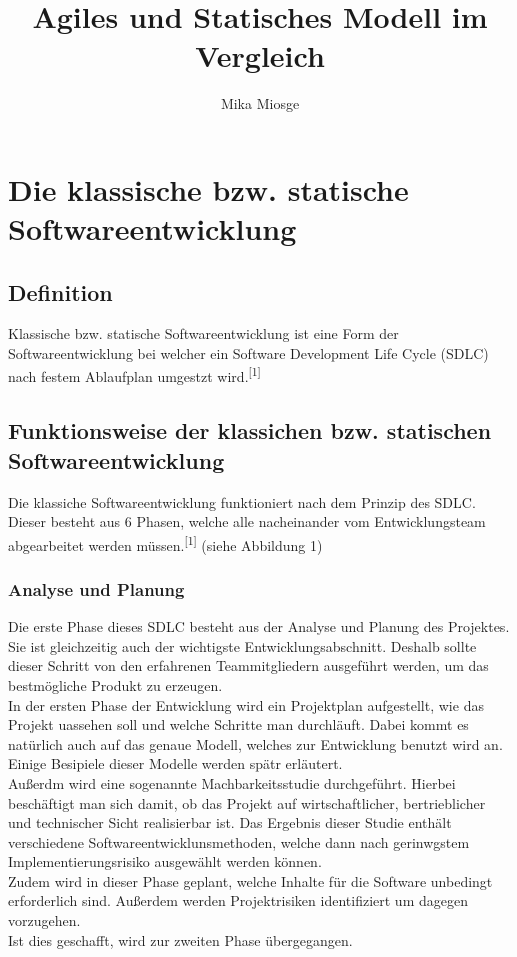 \documentclass[a4paper, 10pt]{scrartcl}
\title{Agiles und Statisches Modell im Vergleich}
\author{Mika Miosge}
\begin{document}
  \section{Die klassische bzw. statische Softwareentwicklung}
\subsection{Definition}
\begin{center}
\large{Klassische bzw. statische Softwareentwicklung ist eine Form der Softwareentwicklung bei welcher ein \glqq Software Development Life Cycle (SDLC)\grqq{} nach festem Ablaufplan umgestzt wird.\textsuperscript{[1]}} 
\end{center}
\subsection{Funktionsweise der klassichen bzw. statischen Softwareentwicklung}
Die klassiche Softwareentwicklung funktioniert nach dem Prinzip des SDLC. Dieser besteht aus 6 Phasen, welche alle nacheinander vom Entwicklungsteam abgearbeitet werden müssen.\textsuperscript{[1]} (siehe Abbildung 1)
\subsubsection{Analyse und Planung}
Die erste Phase dieses SDLC besteht aus der Analyse und Planung des Projektes. Sie ist gleichzeitig auch der wichtigste Entwicklungsabschnitt. Deshalb sollte dieser Schritt von den erfahrenen Teammitgliedern ausgeführt werden, um das bestmögliche Produkt zu erzeugen.\\  
In der ersten Phase der Entwicklung wird ein Projektplan aufgestellt, wie das Projekt uassehen soll und welche Schritte man durchläuft. Dabei kommt es natürlich auch auf das genaue Modell, welches zur Entwicklung benutzt wird an. Einige Besipiele dieser Modelle werden spätr erläutert. \\
Außerdm wird eine sogenannte Machbarkeitsstudie durchgeführt. Hierbei beschäftigt man sich damit, ob das Projekt auf wirtschaftlicher, bertrieblicher und technischer Sicht realisierbar ist. Das Ergebnis dieser Studie enthält verschiedene Softwareentwicklunsmethoden, welche dann nach gerinwgstem Implementierungsrisiko ausgewählt werden können.\\
Zudem wird in dieser Phase geplant, welche Inhalte für die Software unbedingt erforderlich sind. Außerdem werden Projektrisiken identifiziert um dagegen vorzugehen.\\
Ist dies geschafft, wird zur zweiten Phase übergegangen.
\end{document}
